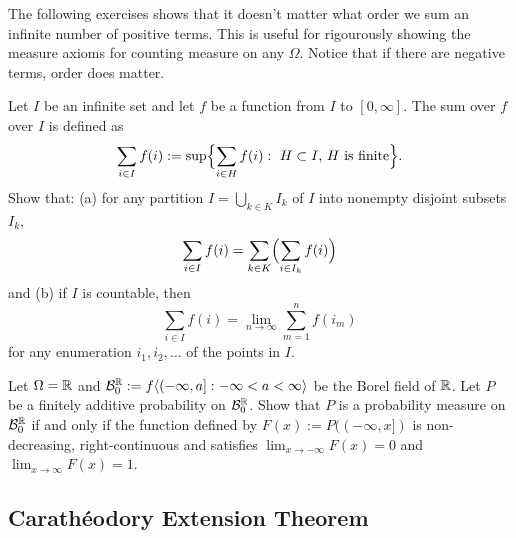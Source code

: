 The following exercises shows that it doesn't matter what order we sum an infinite number of positive terms. This is useful for rigourously showing the measure axioms for counting measure on any $\Omega$. Notice that if there are negative terms, order does matter.
\begin{exercise}
Let $I$ be an infinite set and let $f$ be a function from $I$ to $[0,\infty]$. The sum over $f$ over $I$ is defined as
\[ \sum_{i\in I} f(i):=\sup\Bigl\{ \sum_{i\in H} f(i): \text{ $H\subset I$, $H$ is finite}  \Bigr\}. \]
Show that: (a) for any partition $I = \bigcup_{k\in K} I_k$ of $I$ into nonempty disjoint subsets $I_k$,
\[  \sum_{i\in I} f(i) =  \sum_{k\in K}\Bigl(\sum_{i\in I_k} f(i)\Bigr) \]
and (b) if $I$ is countable, then
\[  \sum_{i\in I} f(i) = \lim_{n\rightarrow \infty} \sum_{m=1}^n f(i_m) \]
for any enumeration $i_1,i_2,\ldots$ of the points in $I$.
\end{exercise}





\begin{exercise}
Let $\Omega = \Bbb R$ and $\mathcal B_0^{\Bbb R}:= f\langle (-\infty,a]: -\infty < a <\infty  \rangle$ be the Borel field of $\Bbb R$. Let $P$ be a finitely additive probability on $\mathcal B_0^{\Bbb R}$. Show that $P$ is a probability measure on  $\mathcal B_0^{\Bbb R}$ if and only if the function defined by $F(x):= P((-\infty, x])$ is non-decreasing, right-continuous and satisfies $\lim_{x\rightarrow -\infty} F(x)=0$ and  $\lim_{x\rightarrow \infty} F(x)=1$.
\end{exercise}
%


\subsection{Carath\'eodory Extension Theorem}



